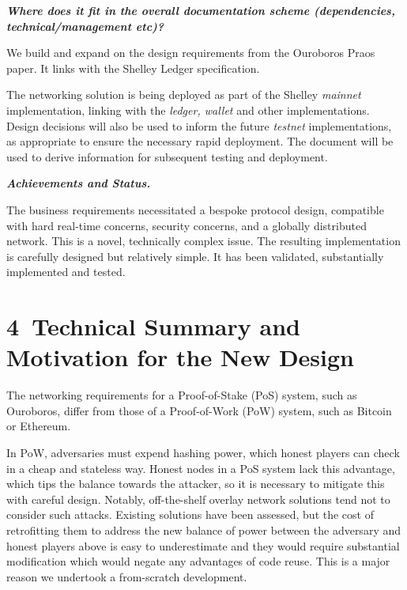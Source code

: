 \documentclass[]{article}
\begin{document}
\emph{\textbf{Where does it fit in the overall documentation scheme
(dependencies, technical/management etc)?}}

We build and expand on the design requirements from the Ouroboros Praos
paper. It links with the Shelley Ledger specification.

The networking solution is being deployed as part of the Shelley
\emph{mainnet} implementation, linking with the \emph{ledger, wallet}
and other implementations. Design decisions will also be used to inform
the future \emph{testnet} implementations, as appropriate to ensure the
necessary rapid deployment. The document will be used to derive
information for subsequent testing and deployment.

\emph{\textbf{Achievements and Status. }}

The business requirements necessitated a bespoke protocol design,
compatible with hard real-time concerns, security concerns, and a
globally distributed network. This is a novel, technically complex
issue. The resulting implementation is carefully designed but relatively
simple. It has been validated, substantially implemented and tested.

\hypertarget{technical-summary-and-motivation-for-the-new-design}{%
\section{​4​~Technical Summary and Motivation for the New
Design}\label{technical-summary-and-motivation-for-the-new-design}}

The networking requirements for a Proof-of-Stake (PoS) system, such as
Ouroboros, differ from those of a Proof-of-Work (PoW) system, such as
Bitcoin or Ethereum.

In PoW, adversaries must expend hashing power, which honest players can
check in a cheap and stateless way. Honest nodes in a PoS system lack
this advantage, which tips the balance towards the attacker, so it is
necessary to mitigate this with careful design. Notably, off-the-shelf
overlay network solutions tend not to consider such attacks. Existing
solutions have been assessed, but the cost of retrofitting them to
address the new balance of power between the adversary and honest
players above is easy to underestimate and they would require
substantial modification which would negate any advantages of code
reuse. This is a major reason we undertook a from-scratch development.
\end{document}
